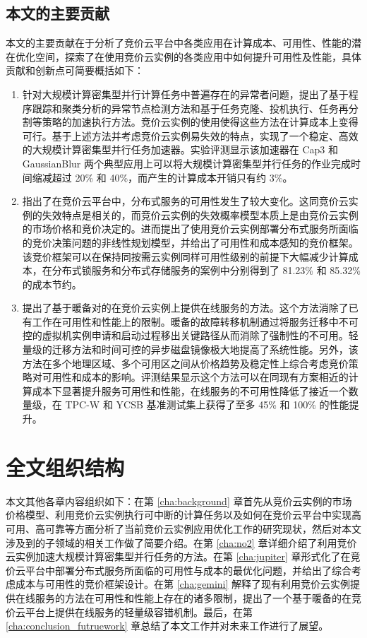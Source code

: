 \subsection{本文的主要贡献}
本文的主要贡献在于分析了竞价云平台中各类应用在计算成本、可用性、性能的潜在优化空间，探索了在使用竞价云实例的各类应用中如何提升可用性及性能，具体贡献和创新点可简要概括如下：
\begin{enumerate}
\item 针对大规模计算密集型并行计算任务中普遍存在的异常者问题，提出了基于程序跟踪和聚类分析的异常节点检测方法和基于任务克隆、投机执行、任务再分割等策略的加速执行方法。竞价云实例的使用使得这些方法在计算成本上变得可行。基于上述方法并考虑竞价云实例易失效的特点，实现了一个稳定、高效的大规模计算密集型并行任务加速器。实验评测显示该加速器在 Cap3 和 GaussianBlur 两个典型应用上可以将大规模计算密集型并行任务的作业完成时间缩减超过 20\% 和 40\%，而产生的计算成本开销只有约 3\%。
\item 指出了在竞价云平台中，分布式服务的可用性发生了较大变化。这同竞价云实例的失效特点是相关的，而竞价云实例的失效概率模型本质上是由竞价云实例的市场价格和竞价决定的。进而提出了使用竞价云实例部署分布式服务所面临的竞价决策问题的非线性规划模型，并给出了可用性和成本感知的竞价框架。该竞价框架可以在保持同按需云实例同样可用性级别的前提下大幅减少计算成本，在分布式锁服务和分布式存储服务的案例中分别得到了 81.23\% 和 85.32\% 的成本节约。
\item 提出了基于暖备对的在竞价云实例上提供在线服务的方法。这个方法消除了已有工作在可用性和性能上的限制。暖备的故障转移机制通过将服务迁移中不可控的虚拟机实例申请和启动过程移出关键路径从而消除了强制性的不可用。轻量级的迁移方法和时间可控的异步磁盘镜像极大地提高了系统性能。另外，该方法在多个地理区域、多个可用区之间从价格趋势及稳定性上综合考虑竞价策略对可用性和成本的影响。评测结果显示这个方法可以在同现有方案相近的计算成本下显著提升服务可用性和性能，在线服务的不可用性降低了接近一个数量级，在 TPC-W 和 YCSB 基准测试集上获得了至多 45\% 和 100\% 的性能提升。
\end{enumerate}

\section{全文组织结构}
本文其他各章内容组织如下：在第 \ref{cha:background} 章首先从竞价云实例的市场价格模型、利用竞价云实例执行可中断的计算任务以及如何在竞价云平台中实现高可用、高可靠等方面分析了当前竞价云实例应用优化工作的研究现状，然后对本文涉及到的子领域的相关工作做了简要介绍。在第 \ref{cha:no2} 章详细介绍了利用竞价云实例加速大规模计算密集型并行任务的方法。在第 \ref{cha:jupiter} 章形式化了在竞价云平台中部署分布式服务所面临的可用性与成本的最优化问题，并给出了综合考虑成本与可用性的竞价框架设计。在第 \ref{cha:gemini} 解释了现有利用竞价云实例提供在线服务的方法在可用性和性能上存在的诸多限制，提出了一个基于暖备的在竞价云平台上提供在线服务的轻量级容错机制。最后，在第 
\ref{cha:conclusion_futruework} 章总结了本文工作并对未来工作进行了展望。
